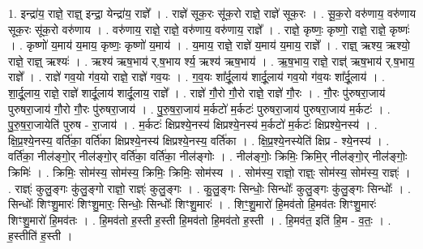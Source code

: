 \documentclass[17pt]{extarticle}
\begin{document}
1. इन्द्रा॑य॒ राज्ञे॒ राज्ञ्॒ इन्द्रा॒ येन्द्रा॑य॒ राज्ञे᳚ । . राज्ञे॑ सूक॒रः सू॑क॒रो राज्ञे॒ राज्ञे॑ सूक॒रः । . सू॒क॒रो वरु॑णाय॒ वरु॑णाय सूक॒रः सू॑क॒रो वरु॑णाय । . वरु॑णाय॒ राज्ञे॒ राज्ञे॒ वरु॑णाय॒ वरु॑णाय॒ राज्ञे᳚ । . राज्ञे॒ कृष्णः॒ कृष्णो॒ राज्ञे॒ राज्ञे॒ कृष्णः॑ । . कृष्णो॑ य॒माय॑ य॒माय॒ कृष्णः॒ कृष्णो॑ य॒माय॑ । . य॒माय॒ राज्ञे॒ राज्ञे॑ य॒माय॑ य॒माय॒ राज्ञे᳚ । . राज्ञ्॒ ऋश्य॒ ऋश्यो॒ राज्ञे॒ राज्ञ्॒ ऋश्यः॑ । . ऋश्य॑ ऋष॒भाय॑ र्.ष॒भाय र्श्य॒ ऋश्य॑ ऋष॒भाय॑ । . ऋ॒ष॒भाय॒ राज्ञे॒ राज्ञ्॑ ऋष॒भाय॑ र्.ष॒भाय॒ राज्ञे᳚ । . राज्ञे॑ गव॒यो ग॑व॒यो राज्ञे॒ राज्ञे॑ गव॒यः । . ग॒व॒यः शा᳚र्दू॒लाय॑ शार्दू॒लाय॑ गव॒यो ग॑व॒यः शा᳚र्दू॒लाय॑ । . शा॒र्दू॒लाय॒ राज्ञे॒ राज्ञे॑ शार्दू॒लाय॑ शार्दू॒लाय॒ राज्ञे᳚ । . राज्ञे॑ गौ॒रो गौ॒रो राज्ञे॒ राज्ञे॑ गौ॒रः । . गौ॒रः पु॑रुषरा॒जाय॑ पुरुषरा॒जाय॑ गौ॒रो गौ॒रः पु॑रुषरा॒जाय॑ । . पु॒रु॒ष॒रा॒जाय॑ म॒र्कटो॑ म॒र्कटः॑ पुरुषरा॒जाय॑ पुरुषरा॒जाय॑ म॒र्कटः॑ । . पु॒रु॒ष॒रा॒जायेति॑ पुरुष - रा॒जाय॑ । . म॒र्कटः॑ क्षिप्रश्ये॒नस्य॑ क्षिप्रश्ये॒नस्य॑ म॒र्कटो॑ म॒र्कटः॑ क्षिप्रश्ये॒नस्य॑ । . क्षि॒प्र॒श्ये॒नस्य॒ वर्ति॑का॒ वर्ति॑का क्षिप्रश्ये॒नस्य॑ क्षिप्रश्ये॒नस्य॒ वर्ति॑का । . क्षि॒प्र॒श्ये॒नस्येति॑ क्षिप्र - श्ये॒नस्य॑ । . वर्ति॑का॒ नील॑ङ्गो॒र् नील॑ङ्गो॒र् वर्ति॑का॒ वर्ति॑का॒ नील॑ङ्गोः । . नील॑ङ्गोः॒ क्रिमिः॒ क्रिमि॒र् नील॑ङ्गो॒र् नील॑ङ्गोः॒ क्रिमिः॑ । . क्रिमिः॒ सोम॑स्य॒ सोम॑स्य॒ क्रिमिः॒ क्रिमिः॒ सोम॑स्य । . सोम॑स्य॒ राज्ञो॒ राज्ञ्ः॒ सोम॑स्य॒ सोम॑स्य॒ राज्ञ्ः॑ । . राज्ञ्ः॑ कुलु॒ङ्गः कु॑लु॒ङ्गो राज्ञो॒ राज्ञ्ः॑ कुलु॒ङ्गः । . कु॒लु॒ङ्गः सिन्धोः॒ सिन्धोः᳚ कुलु॒ङ्गः कु॑लु॒ङ्गः सिन्धोः᳚ । . सिन्धोः᳚ शिꣳशु॒मारः॑ शिꣳशु॒मारः॒ सिन्धोः॒ सिन्धोः᳚ शिꣳशु॒मारः॑ । . शिꣳ॒॒शु॒मारो॑ हि॒मव॑तो हि॒मव॑तः शिꣳशु॒मारः॑ शिꣳशु॒मारो॑ हि॒मव॑तः । . हि॒मव॑तो ह॒स्ती ह॒स्ती हि॒मव॑तो हि॒मव॑तो ह॒स्ती । . हि॒मव॑त॒ इति॑ हि॒म - व॒तः॒ । . ह॒स्तीति॑ ह॒स्ती । \newline
\end{document}
